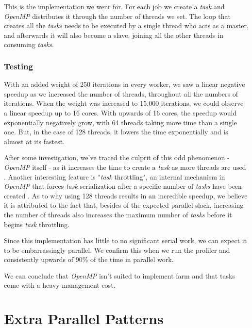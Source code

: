 \documentclass[10pt,journal]{IEEEtran}
\begin{document}
This is the implementation we went for. For each job we create a \textit{task} and \textit{OpenMP} distributes it through the number of threads we set. The loop that creates all the \textit{tasks} needs to be executed by a single thread who acts as a master, and afterwards it will also become a slave, joining all the other threads in consuming \textit{tasks}.

\subsubsection{Testing}

With an added weight of 250 iterations in every worker, we saw a linear negative speedup as we increased the number of threads, throughout all the numbers of iterations. When the weight was increased to 15.000 iterations, we could observe a linear speedup up to 16 cores. With upwards of 16 cores, the speedup would exponentially negatively grow, with 64 threads taking more time than a single one. But, in the case of 128 threads, it lowers the time exponentially and is almost at its fastest.

After some investigation, we've traced the culprit of this odd phenomenon - \textit{OpenMP} itself - as it increases the time to create a \textit{task} as more threads are used \cite{granularity}. Another interesting feature is "\textit{task} throttling", an internal mechanism in \textit{OpenMP} that forces \textit{task} serialization after a specific number of \textit{tasks} have been created \cite{granularity}. As to why using 128 threads results in an incredible speedup, we believe it is attributed to the fact that, besides of the expected parallel slack, increasing the number of threads also increases the maximum number of \textit{tasks} before it begins \textit{task} throttling.

Since this implementation has little to no significant serial work, we can expect it to be embarrassingly parallel. We confirm this when we run the profiler and consistently upwards of 90\% of the time in parallel work.

We can conclude that \textit{OpenMP} isn't suited to implement farm and that tasks come with a heavy management cost. 

\section{Extra Parallel Patterns}

\end{document}
